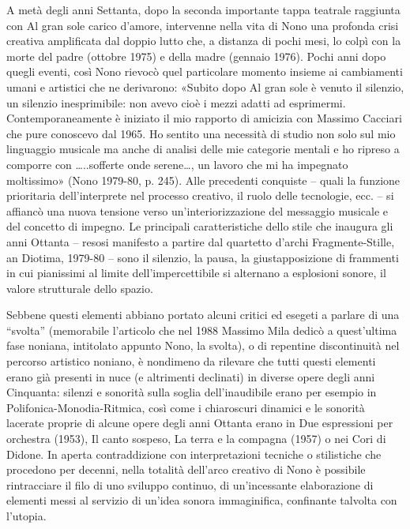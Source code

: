 A metà degli anni Settanta, dopo la seconda importante tappa teatrale raggiunta con Al gran sole carico d’amore, intervenne nella vita di Nono una profonda crisi creativa amplificata dal doppio lutto che, a distanza di pochi mesi, lo colpì con la morte del padre (ottobre 1975) e della madre (gennaio 1976). Pochi anni dopo quegli eventi, così Nono rievocò quel particolare momento insieme ai cambiamenti umani e artistici che ne derivarono: «Subito dopo Al gran sole è venuto il silenzio, un silenzio inesprimibile: non avevo cioè i mezzi adatti ad esprimermi. Contemporaneamente è iniziato il mio rapporto di amicizia con Massimo Cacciari che pure conoscevo dal 1965. Ho sentito una necessità di studio non solo sul mio linguaggio musicale ma anche di analisi delle mie categorie mentali e ho ripreso a comporre con …..sofferte onde serene…, un lavoro che mi ha impegnato moltissimo» (Nono 1979-80, p. 245). Alle precedenti conquiste – quali la funzione prioritaria dell’interprete nel processo creativo, il ruolo delle tecnologie, ecc. – si affiancò una nuova tensione verso un’interiorizzazione del messaggio musicale e del concetto di impegno. Le principali caratteristiche dello stile che inaugura gli anni Ottanta – resosi manifesto a partire dal quartetto d’archi Fragmente-Stille, an Diotima, 1979-80 – sono il silenzio, la pausa, la giustapposizione di frammenti in cui pianissimi al limite dell’impercettibile si alternano a esplosioni sonore, il valore strutturale dello spazio.

Sebbene questi elementi abbiano portato alcuni critici ed esegeti a parlare di una “svolta” (memorabile l’articolo che nel 1988 Massimo Mila dedicò a quest’ultima fase noniana, intitolato appunto Nono, la svolta), o di repentine discontinuità nel percorso artistico noniano, è nondimeno da rilevare che tutti questi elementi erano già presenti in nuce (e altrimenti declinati) in diverse opere degli anni Cinquanta: silenzi e sonorità sulla soglia dell’inaudibile erano per esempio in Polifonica-Monodia-Ritmica, così come i chiaroscuri dinamici e le sonorità lacerate proprie di alcune opere degli anni Ottanta erano in Due espressioni per orchestra (1953), Il canto sospeso, La terra e la compagna (1957) o nei Cori di Didone. In aperta contraddizione con interpretazioni tecniche o stilistiche che procedono per decenni, nella totalità dell’arco creativo di Nono è possibile rintracciare il filo di uno sviluppo continuo, di un’incessante elaborazione di elementi messi al servizio di un’idea sonora immaginifica, confinante talvolta con l’utopia.

